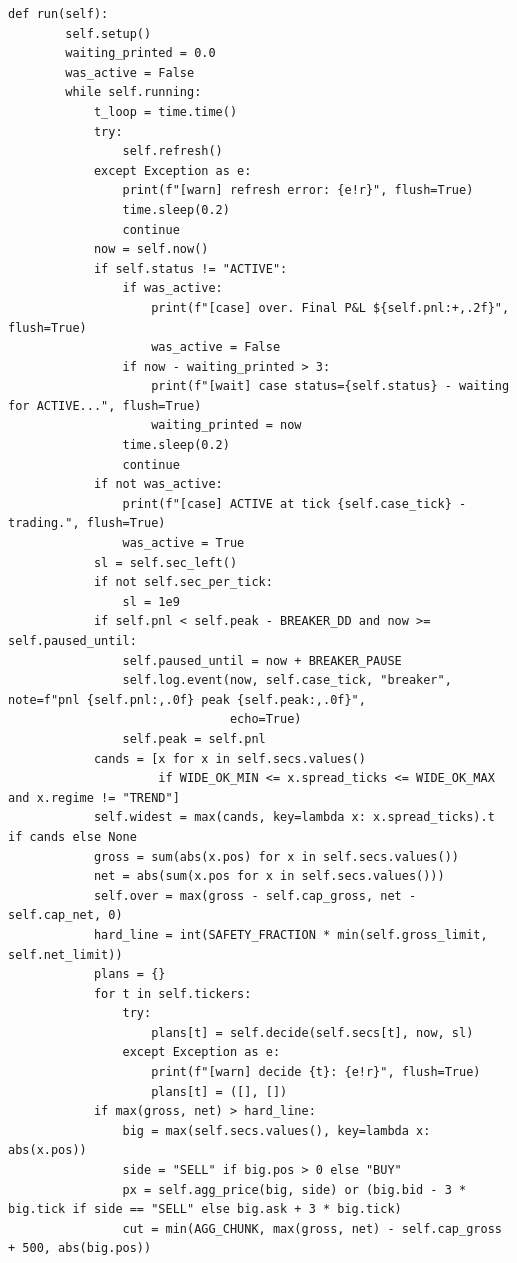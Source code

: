 \begin{lstlisting}[style=algocode]
    def run(self):
        self.setup()
        waiting_printed = 0.0
        was_active = False
        while self.running:
            t_loop = time.time()
            try:
                self.refresh()
            except Exception as e:
                print(f"[warn] refresh error: {e!r}", flush=True)
                time.sleep(0.2)
                continue
            now = self.now()
            if self.status != "ACTIVE":
                if was_active:
                    print(f"[case] over. Final P&L ${self.pnl:+,.2f}", flush=True)
                    was_active = False
                if now - waiting_printed > 3:
                    print(f"[wait] case status={self.status} - waiting for ACTIVE...", flush=True)
                    waiting_printed = now
                time.sleep(0.2)
                continue
            if not was_active:
                print(f"[case] ACTIVE at tick {self.case_tick} - trading.", flush=True)
                was_active = True
            sl = self.sec_left()
            if not self.sec_per_tick:
                sl = 1e9
            if self.pnl < self.peak - BREAKER_DD and now >= self.paused_until:
                self.paused_until = now + BREAKER_PAUSE
                self.log.event(now, self.case_tick, "breaker", note=f"pnl {self.pnl:,.0f} peak {self.peak:,.0f}",
                               echo=True)
                self.peak = self.pnl
            cands = [x for x in self.secs.values()
                     if WIDE_OK_MIN <= x.spread_ticks <= WIDE_OK_MAX and x.regime != "TREND"]
            self.widest = max(cands, key=lambda x: x.spread_ticks).t if cands else None
            gross = sum(abs(x.pos) for x in self.secs.values())
            net = abs(sum(x.pos for x in self.secs.values()))
            self.over = max(gross - self.cap_gross, net - self.cap_net, 0)
            hard_line = int(SAFETY_FRACTION * min(self.gross_limit, self.net_limit))
            plans = {}
            for t in self.tickers:
                try:
                    plans[t] = self.decide(self.secs[t], now, sl)
                except Exception as e:
                    print(f"[warn] decide {t}: {e!r}", flush=True)
                    plans[t] = ([], [])
            if max(gross, net) > hard_line:
                big = max(self.secs.values(), key=lambda x: abs(x.pos))
                side = "SELL" if big.pos > 0 else "BUY"
                px = self.agg_price(big, side) or (big.bid - 3 * big.tick if side == "SELL" else big.ask + 3 * big.tick)
                cut = min(AGG_CHUNK, max(gross, net) - self.cap_gross + 500, abs(big.pos))

\end{lstlisting}
